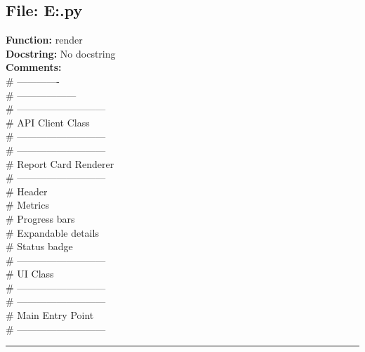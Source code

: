 {\subsection*{File: E:\project\capstone\frontend\view.py}
\textbf{Function:} render\\
\textbf{Docstring:} No docstring\\
\textbf{Comments:}\\
# -------------\\
# ------------------\\
# ---------------------------\\
# API Client Class\\
# ---------------------------\\
# ---------------------------\\
# Report Card Renderer\\
# ---------------------------\\
# Header\\
# Metrics\\
# Progress bars\\
# Expandable details\\
# Status badge\\
# ---------------------------\\
# UI Class\\
# ---------------------------\\
# ---------------------------\\
# Main Entry Point\\
# ---------------------------\\

\hrule

}
